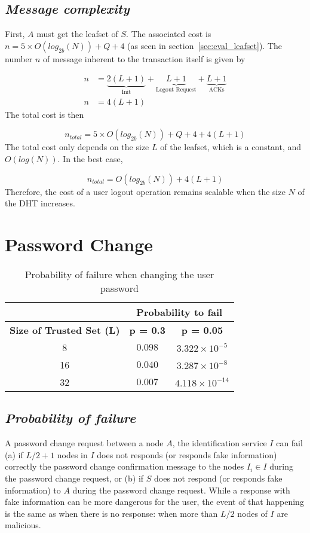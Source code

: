     
  \subsection{\textit{Message complexity}}
    First, $A$ must get the leafset of $S$. The associated cost is $n = 5
\times O(log_{2b}(N)) + Q + 4$ (as seen in section~\ref{sec:eval_leafset}).
    The number $n$ of message inherent to the transaction itself is given by

    \begin{align}
      n &= \underbrace{2(L+1)}_\text{Init} +  \underbrace{L+1}_\text{Logout Request} + \underbrace{L+1}_\text{ACKs}\\
      n &= 4(L+1)
    \end{align}
     The total cost is then

    $$
      n_{total} = 5 \times O(log_{2b}(N)) + Q + 4 + 4(L+1)
    $$    
    The total cost only depends on the size $L$ of the leafset, which is a
constant, and $O(log(N))$. In the best case, 

    $$
      n_{total} = O(log_{2b}(N)) + 4(L+1)
    $$
    Therefore, the cost of a user logout operation remains scalable when the size $N$ of the DHT increases.

\section{Password Change}
  \label{sec:eval_password_change}
  \begin{table}
    \centering
    \footnotesize
    \begin{tabular}{|c|c|c|}
      \cline{2-3}
      \multicolumn{1}{c|}{}&  \multicolumn{2}{c|}{\textbf{Probability to fail}} \\ \cline{2-3}
      \hline
      \textbf{Size of Trusted Set (L)} & \textbf{p = 0.3} & \textbf{p = 0.05} \\
      \hline \hline
      8 &  $0.098$ & $3.322 \times 10^{-5}$ \\
      \hline
      16 & $0.040$ & $3.287 \times 10^{-8}$  \\
      \hline
      32 & $0.007$ & $4.118 \times 10^{-14}$  \\
      \hline
    \end{tabular}
    \caption{Probability of failure when changing the user password}
    \label{tab:p_password_change}
  \end{table}
  
  \subsection{\textit{Probability of failure}}
    A password change request between a node $A$, the identification service
$I$ can fail (a) if $L/2 + 1$ nodes in $I$ does not responds (or responds fake
information) correctly the password change confirmation message to the nodes 
$I_i \in I$ during the password change request, or (b) if $S$ does not respond (or responds fake information) to $A$
during the password change request. While a response with fake information can be more dangerous for the
user, the event of that happening is the same as when there is no response:
when more than $L/2$ nodes of $I$ are malicious.

